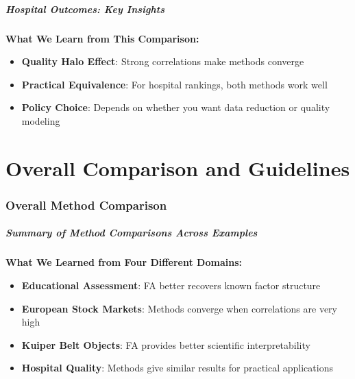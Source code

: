 \documentclass[aspectratio=169]{beamer}
\begin{document}
\begin{frame}
    \frametitle{Hospital Outcomes: Key Insights}
    \textbf{What We Learn from This Comparison:}
    \begin{itemize}
        \item \textbf{Quality Halo Effect}: Strong correlations make methods converge \pause
        \item \textbf{Practical Equivalence}: For hospital rankings, both methods work well \pause
        \item \textbf{Policy Choice}: Depends on whether you want data reduction or quality modeling \pause
    \end{itemize}
\end{frame}


\part{Overall Comparison and Guidelines}

\begin{frame}
    \partpage
\end{frame}

\section{Overall Method Comparison}

\begin{frame}
    \frametitle{Summary of Method Comparisons Across Examples}
    \textbf{What We Learned from Four Different Domains:}
    \begin{itemize}
        \item \textbf{Educational Assessment}: FA better recovers known factor structure \pause
        \item \textbf{European Stock Markets}: Methods converge when correlations are very high \pause
        \item \textbf{Kuiper Belt Objects}: FA provides better scientific interpretability \pause
        \item \textbf{Hospital Quality}: Methods give similar results for practical applications \pause
    \end{itemize}
\end{frame}
\end{document}
